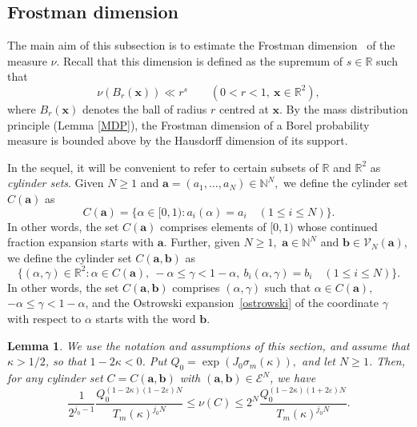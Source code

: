 \documentclass[12pt, reqno]{amsart}
\newtheorem{lemma}[thm]{Lemma}
\theoremstyle{definition}
\theoremstyle{remark}
\numberwithin{equation}{section}
\def\alp{{\alpha}} \def\bfalp{{\boldsymbol \alpha}}
\def\gam{{\gamma}} \def\Gam{{\Gamma}}
\def\le{\leqslant} \def\ge{\geqslant}
\def\ls{\leqslant} \def\gs{\geqslant}
\def\leq{\leqslant}
\def \bN {\mathbb N}
\def \bR {\mathbb R}
\def \ba {\mathbf a}
\def \bb {\mathbf b}
\def \bx {\mathbf x}
\def \cE {\mathcal E}
\def \cV {\mathcal V}
\begin{document}
\subsection{Frostman dimension} 

The main aim of this subsection is to estimate the Frostman dimension~\cite{FFK2021, KPV2022} of the measure $\nu$. Recall that this dimension is defined as the supremum of $s \in \bR$ such that
\[
\nu(B_r(\bx)) \ll r^s
\qquad (0 < r < 1, \: \bx \in \bR^2),
\]
where $B_r(\bx)$ denotes the ball of radius $r$ centred at $\bx$. By the mass distribution principle (Lemma \ref{MDP}), the Frostman dimension of a Borel probability measure is bounded above by the Hausdorff dimension of its support.

In the sequel, it will be convenient to refer to certain subsets of $\bR$ and $\bR^2$ as \emph{cylinder sets}. Given $N\gs 1$ and $\ba = (a_1,\ldots, a_N) \in \bN^N,$ we define the cylinder set $C(\ba)$ as 
\[ 
C(\ba) = \{ \alpha \in [0,1) : a_i(\alp) = a_i
\quad (1\ls i \ls N) \}. 
\]
In other words, the set $C(\ba)$ comprises elements of $[0,1)$ whose continued fraction expansion starts with $\ba$. Further, given $N\gs 1,$ $\ba\in \bN^N$ and $\bb\in\cV_N(\ba)$, we define the cylinder set $C(\ba,\bb)$ as
\[ 
\{ (\alpha,\gamma) \in \bR^2 : \alp \in C(\ba), \: -\alpha
\le \gamma < 1-\alpha, \:
b_i(\alp,\gam) = b_i
\quad (1\ls i \ls N) \}. 
\] 
In other words, the set $C(\ba,\bb)$ comprises $(\alpha,\gamma)$ such that $\alp \in C(\ba),$  $-\alpha \le \gamma
< 1-\alpha$,
and the Ostrowski expansion~\eqref{ostrowski} of the coordinate $\gamma$ with respect to $\alp$  starts with the word $\bb$.
\begin{lemma} \label{lem_size_of_cylinder_set}
We use the notation and assumptions of this section, and assume that $\kappa>1/2$, so that $1-2\kappa<0$. 
Put
$
Q_0 =
\exp(J_0 \sigma_m(\kappa)),
$
and let $N \gs 1$. Then, for any cylinder set $C=C(\ba,\bb)$ with $(\ba,\bb)\in\cE^N$, we have
\[
\frac{1}{2^{j_0-1}} 
\frac{Q_0^{(1-2\kappa)
	(1-2\varepsilon)N}}
{T_m(\kappa)^{j_0 N}} \leq \nu(C)\leq 2^{N}
\frac{Q_0^{(1-2\kappa)(1+2\varepsilon)N}}
{T_m(\kappa)^{j_0 N}}. 
\]
\end{lemma}
\end{document}
